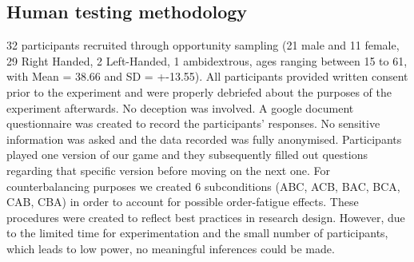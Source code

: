 \subsection{Human testing methodology}

32 participants recruited through opportunity sampling (21 male and 11 female, 29 Right Handed, 2 Left-Handed, 1 ambidextrous, ages ranging between 15 to 61, with Mean = 38.66 and SD = +-13.55). All participants provided written consent prior to the experiment and were properly debriefed about the purposes of the experiment afterwards. No deception was involved. A google document questionnaire was created to record the participants’ responses. No sensitive information was asked and the data recorded was fully anonymised. Participants played one version of our game and they subsequently filled out questions regarding that specific version before moving on the next one. For counterbalancing purposes we created 6 subconditions (ABC, ACB, BAC, BCA, CAB, CBA) in order to account for possible order-fatigue effects. These procedures were created to reflect best practices in research design. However, due to the limited time for experimentation and the small number of participants, which leads to low power, no meaningful inferences could be made.